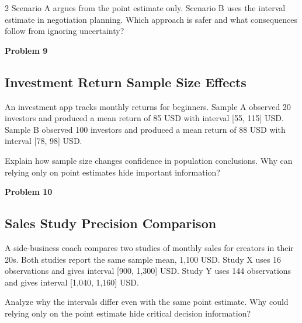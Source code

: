 \documentclass[12pt]{article}
\newcommand{\SubsectionBox}[1]{%
\noindent\colorbox{gray!30}{\parbox{\linewidth}{\textbf{#1}}}\par\vspace{0.35cm}%
}
\begin{document}
\begin{multicols}{2}
		Scenario A argues from the point estimate only.
		Scenario B uses the interval estimate in negotiation planning.
		Which approach is safer and what consequences follow from ignoring uncertainty?

\vspace{0.5cm}
\SubsectionBox{Problem 9}
\subsection*{Investment Return Sample Size Effects}
An investment app tracks monthly returns for beginners.
		Sample A observed 20 investors and produced a mean return of 85 USD with interval [55, 115] USD.
		Sample B observed 100 investors and produced a mean return of 88 USD with interval [78, 98] USD.

		Explain how sample size changes confidence in population conclusions.
		Why can relying only on point estimates hide important information?

\vspace{0.5cm}
\SubsectionBox{Problem 10}
\subsection*{Sales Study Precision Comparison}
A side-business coach compares two studies of monthly sales for creators in their 20s.
		Both studies report the same sample mean, 1,100 USD.
		Study X uses 16 observations and gives interval [900, 1,300] USD.
		Study Y uses 144 observations and gives interval [1,040, 1,160] USD.

		Analyze why the intervals differ even with the same point estimate.
		Why could relying only on the point estimate hide critical decision information?

\end{multicols}
\end{document}
